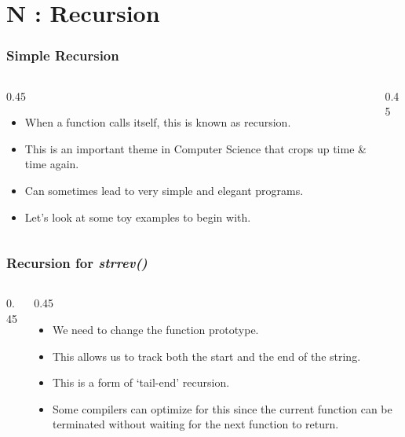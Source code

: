\section{N : Recursion}
\label{chap:recurs}


\begin{frame}[fragile]
\frametitle{Simple Recursion}
\begin{columns}[T]

\begin{column}{0.45\textwidth}
\begin{itemize}[<+->]
\item When a function calls itself, this is known as recursion.
\item This is an important theme in Computer Science that crops up
time \& time again.
\item Can sometimes lead to very simple and elegant programs.
\item Let's look at some toy examples to begin with.
\end{itemize}
\end{column}

\pause
\begin{column}{0.45\textwidth}

\end{column}

\end{columns}
\end{frame}


\begin{frame}[fragile]
\frametitle{Recursion for {\em strrev()}}

\begin{columns}[T]

\begin{column}{0.45\textwidth}

\end{column}

\pause
\begin{column}{0.45\textwidth}
\begin{itemize}[<+->]
\item We need to change the function prototype.
\item This allows us to track both the start and the end of the string.
\item This is a form of `tail-end' recursion.
\item Some compilers can optimize for this since the current function can be terminated
without waiting for the next function to return.
\end{itemize}
\end{column}

\end{columns}
\end{frame}

